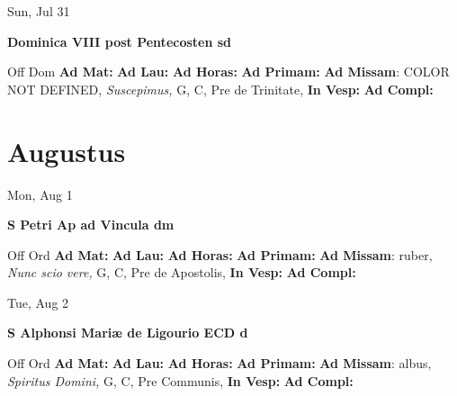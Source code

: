 \documentclass[10pt]{book}
\begin{document}
\begin{center}
\begin{minipage}{3.5in}
\vspace{2em}
\begin{center}Sun, Jul 31
\end{center}
\textbf{ \large Dominica VIII post Pentecosten
\textnormal{\normalsize sd}}

\begin{justify}Off Dom
\textbf{Ad Mat: }
\textbf{Ad Lau: }
\textbf{Ad Horas: }
\textbf{Ad Primam: }\textbf{Ad Missam}: COLOR NOT DEFINED, \textit{Suscepimus,} G, C, Pre de Trinitate, 
\textbf{In Vesp: }
\textbf{Ad Compl: }
\end{justify}
\end{minipage}
\end{center}

    \chapter*{Augustus}
                    
\begin{center}
\begin{minipage}{3.5in}
\vspace{2em}
\begin{center}Mon, Aug 1
\end{center}
\textbf{ \large S Petri Ap ad Vincula
\textnormal{\normalsize dm}}

\begin{justify}Off Ord
\textbf{Ad Mat: }
\textbf{Ad Lau: }
\textbf{Ad Horas: }
\textbf{Ad Primam: }\textbf{Ad Missam}: ruber, \textit{Nunc scio vere,} G, C, Pre de Apostolis, 
\textbf{In Vesp: }
\textbf{Ad Compl: }
\end{justify}
\end{minipage}
\end{center}

\begin{center}
\begin{minipage}{3.5in}
\vspace{2em}
\begin{center}Tue, Aug 2
\end{center}
\textbf{ \large S Alphonsi Mariæ de Ligourio ECD
\textnormal{\normalsize d}}

\begin{justify}Off Ord
\textbf{Ad Mat: }
\textbf{Ad Lau: }
\textbf{Ad Horas: }
\textbf{Ad Primam: }\textbf{Ad Missam}: albus, \textit{Spiritus Domini,} G, C, Pre Communis, 
\textbf{In Vesp: }
\textbf{Ad Compl: }
\end{justify}
\end{minipage}
\end{center}
\end{document}
